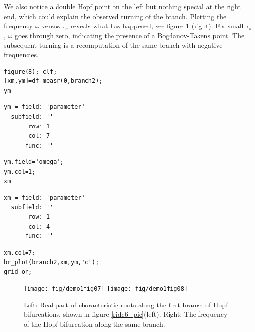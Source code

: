 \documentclass[10pt]{scrartcl}
\begin{document}
We also notice a double Hopf point on the left but nothing special at the
right end, which could explain the observed turning of the branch.
Plotting the frequency $\omega$ versus $\tau_s$ reveals what has happened,
see figure \ref{ride7+8_pic} (right).
For small $\tau_s$, $\omega$ goes through zero, indicating the presence
of a Bogdanov-Takens point. The subsequent turning is a recomputation
of the same branch with negative frequencies.
\begin{lstlisting}
figure(8); clf;
[xm,ym]=df_measr(0,branch2);
ym
\end{lstlisting}
{\small
\begin{verbatim}
ym = field: 'parameter'
  subfield: ''
       row: 1
       col: 7
      func: ''
\end{verbatim}}
\begin{lstlisting}
ym.field='omega';
ym.col=1;
xm
\end{lstlisting}
{\small
\begin{verbatim}
xm = field: 'parameter'
  subfield: ''
       row: 1
       col: 4
      func: ''
\end{verbatim}}
\begin{lstlisting}
xm.col=7;
br_plot(branch2,xm,ym,'c');  
grid on;
\end{lstlisting}
\begin{figure}[h]
\begin{center}
\texttt{[image: fig/demo1fig07]}
\texttt{[image: fig/demo1fig08]}
\end{center}
\caption{\label{ride7+8_pic}Left: Real part of characteristic roots
  along the first branch of Hopf bifurcations, shown in figure
  \ref{ride6_pic}(left). Right: The frequency of the Hopf
  bifurcation along the same branch.}
\end{figure}
\end{document}
